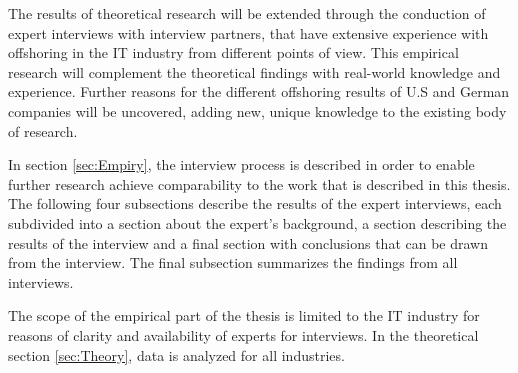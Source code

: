 The results of theoretical research will be extended through the conduction of expert interviews with interview partners, that have extensive experience with offshoring in the IT industry from different points of view. This empirical research will complement the theoretical findings with real-world knowledge and experience. Further reasons for the different offshoring results of U.S and German companies will be uncovered, adding new, unique knowledge to the existing body of research.

In section \ref{sec:Empiry}, the interview process is described in order to enable further research achieve comparability to the work that is described in this thesis. The following four subsections describe the results of the expert interviews, each subdivided into a section about the expert's background, a section describing the results of the interview and a final section with conclusions that can be drawn from the interview. The final subsection summarizes the findings from all interviews.

The scope of the empirical part of the thesis is limited to the IT industry for reasons of clarity and availability of experts for interviews. In the theoretical section \ref{sec:Theory}, data is analyzed for all industries.